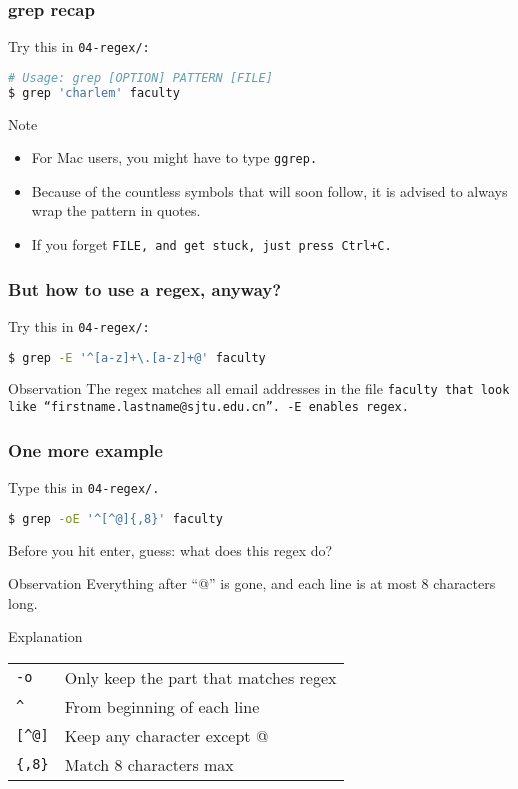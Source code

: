 \begin{frame}[fragile]
\frametitle{grep recap}
Try this in \tt{04-regex/}:
\begin{lstlisting}[language=bash]
# Usage: grep [OPTION] PATTERN [FILE]
$ grep 'charlem' faculty
\end{lstlisting}
\begin{block}{Note}
    \begin{itemize}
        \item For Mac users, you might have to type \tt{ggrep}.
        \item Because of the countless symbols that will soon follow,
            it is advised to always wrap the pattern in quotes.
        \item If you forget \tt{FILE}, and get stuck, just press Ctrl+C.
    \end{itemize}
\end{block}
\end{frame}

\begin{frame}[fragile]
\frametitle{But how to use a regex, anyway?}
Try this in \tt{04-regex/}:
\begin{lstlisting}[language=bash]
$ grep -E '^[a-z]+\.[a-z]+@' faculty
\end{lstlisting}
\pause
\begin{block}{Observation}
    The regex matches all email addresses in the file \tt{faculty}
    that look like ``firstname.lastname@sjtu.edu.cn''.
    \newline \newline
    \tt{-E} enables regex.
\end{block}
\end{frame}

\begin{frame}[fragile]
\frametitle{One more example}
Type this in \tt{04-regex/}.
\begin{lstlisting}[language=bash]
$ grep -oE '^[^@]{,8}' faculty
\end{lstlisting}
Before you hit enter, guess: what does this regex do?
\pause
\begin{block}{Observation}
    Everything after ``@'' is gone, and each line is at most 8 characters long.
\end{block}
\begin{block}{Explanation}
    \begin{tabular}{ll}
        \verb|-o|   & Only keep the part that matches regex \\
        \verb|^|    & From beginning of each line \\
        \verb|[^@]| & Keep any character except @ \\
        \verb|{,8}| & Match 8 characters max \\
    \end{tabular}
\end{block}
\end{frame}

